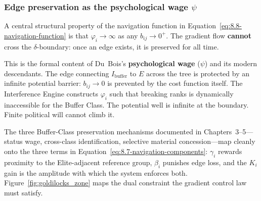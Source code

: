 \subsubsection*{Edge preservation as the psychological wage \texorpdfstring{$\psi$}{psi}}

A central structural property of the navigation function in Equation~\ref{eq:8.8-navigation-function} is that $\varphi_i \to \infty$ as any $b_{ij} \to 0^+$. The gradient flow \textbf{cannot} cross the $\delta$-boundary: once an edge exists, it is preserved for all time.

This is the formal content of Du~Bois's \textbf{psychological wage} ($\psi$) and its modern descendants. The edge connecting $I_{\text{buffer}}$ to $E$ across the tree is protected by an infinite potential barrier: $b_{ij} \to 0$ is prevented by the cost function itself. The Interference Engine constructs $\varphi_i$ such that breaking ranks is dynamically inaccessible for the Buffer Class. The potential well is infinite at the boundary. Finite political will cannot climb it.

The three Buffer-Class preservation mechanisms documented in Chapters~3--5---status wage, cross-class identification, selective material concession---map cleanly onto the three terms in Equation~\ref{eq:8.7-navigation-components}: $\gamma_i$ rewards proximity to the Elite-adjacent reference group, $\beta_i$ punishes edge loss, and the $K_i$ gain is the amplitude with which the system enforces both. Figure~\ref{fig:goldilocks_zone} maps the dual constraint the gradient control law must satisfy.

